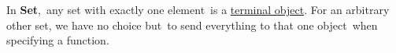 In \textbf{Set}, \,any set with exactly one element\, is a \href{doc/1 math/Seven Sketches in Compositionality/Chapter 3: Databases/5 Introduction to limits and colimits/1 Terminal objects and products/1 Terminal object}{terminal object}. For an arbitrary other set, we have no choice but \,to send everything to that one object\, when specifying a function.
